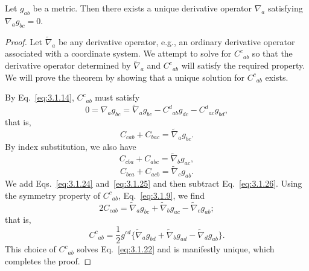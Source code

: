 \begin{theorem}\label{thm:3.1.1}
Let $g_{ab}$ be a metric. Then there exists a unique derivative operator
$\nabla_a$ satisfying $\nabla_ag_{bc}=0$.
\end{theorem}
\begin{proof}
Let $\widetilde\nabla_a$ be any derivative operator, e.g., an ordinary derivative operator
associated with a coordinate system. We attempt to solve for $C^c{}_{ab}$ so that the
derivative operator determined by $\widetilde\nabla_a$ and $C^c{}_{ab}$ will satisfy the required property. We
will prove the theorem by showing that a unique solution for $C^c{}_{ab}$ exists.

By Eq.~\eqref{eq:3.1.14}, $C^c{}_{ab}$ must satisfy
\begin{equation}
  0=\nabla_ag_{bc}=\widetilde\nabla_ag_{bc}-C^d{}_{ab}g_{dc}-C^d{}_{ac}g_{bd},
  \tag{3.1.23}\label{eq:3.1.23}
\end{equation}
that is,
\begin{equation}
  C_{cab}+C_{bac}=\widetilde\nabla_ag_{bc}.
  \tag{3.1.24}\label{eq:3.1.24}
\end{equation}
By index substitution, we also have
\begin{equation}
  C_{cba}+C_{abc}=\widetilde\nabla_bg_{ac},
  \tag{3.1.25}\label{eq:3.1.25}
\end{equation}
\begin{equation}
  C_{bca}+C_{acb}=\widetilde\nabla_cg_{ab}.
  \tag{3.1.26}\label{eq:3.1.26}
\end{equation}
We add Eqs.~\eqref{eq:3.1.24} and~\eqref{eq:3.1.25} and then subtract Eq.~\eqref{eq:3.1.26}. Using
the symmetry property of $C^c{}_{ab}$, Eq.~\eqref{eq:3.1.9}, we find
\begin{equation}
  2C_{cab}=\widetilde\nabla_ag_{bc}+\widetilde\nabla_bg_{ac}-\widetilde\nabla_cg_{ab};
  \tag{3.1.27}\label{eq:3.1.27}
\end{equation}
that is,
\begin{equation}
  C^c{}_{ab}=\frac{1}{2}g^{cd}
  \bigl\{\widetilde\nabla_ag_{bd}+\widetilde\nabla_bg_{ad}-\widetilde\nabla_dg_{ab}\bigr\}.
  \tag{3.1.28}\label{eq:3.1.28}
\end{equation}
This choice of $C^c{}_{ab}$ solves Eq.~\eqref{eq:3.1.22} and is manifestly unique, which completes the proof.
\end{proof}

